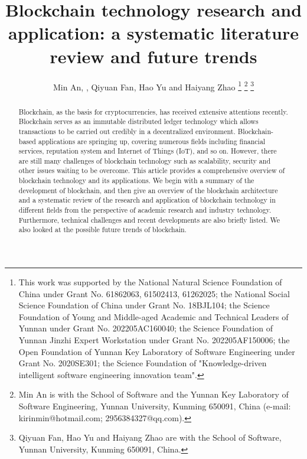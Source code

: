 \documentclass[lettersize,journal]{IEEEtran}
\begin{document}
\title{Blockchain technology research and application: a systematic literature review and future trends}


\author{Min An, , Qiyuan Fan, Hao Yu and Haiyang Zhao
\thanks{This work was supported by the National Natural Science Foundation of China under Grant No. 61862063, 61502413, 61262025; the National Social Science Foundation of China under Grant No. 18BJL104; the Science Foundation of Young and Middle-aged Academic and Technical Leaders of Yunnan under Grant No. 202205AC160040; the Science Foundation of Yunnan Jinzhi Expert Workstation under Grant No. 202205AF150006; the Open Foundation of Yunnan Key Laboratory of Software Engineering under Grant No. 2020SE301; the Science Foundation of "Knowledge-driven intelligent software engineering innovation team".}%
\thanks{Min An is with the School of Software and the Yunnan Key Laboratory of Software Engineering, Yunnan University, Kunming 650091, China (e-mail: kirinmin@hotmail.com; 2956384327@qq.com).}
\thanks{Qiyuan Fan, Hao Yu and Haiyang Zhao are with the School of Software, Yunnan University, Kunming 650091, China.}}





\maketitle

\begin{abstract}
Blockchain, as the basis for cryptocurrencies, has received extensive attentions recently. Blockchain serves as an immutable distributed ledger technology which allows transactions to be carried out credibly in a decentralized environment. Blockchain-based applications are springing up, covering numerous fields including financial services, reputation system and Internet of Things (IoT), and so on. However, there are still many challenges of blockchain technology such as scalability, security and other issues waiting to be overcome. This article provides a comprehensive overview of blockchain technology and its applications. We begin with a summary of the development of blockchain, and then give an overview of the blockchain architecture and a systematic review of the research and application of blockchain technology in different fields from the perspective of academic research and industry technology. Furthermore, technical challenges and recent developments are also briefly listed. We also looked at the possible future trends of blockchain.
\end{abstract}
\end{document}
